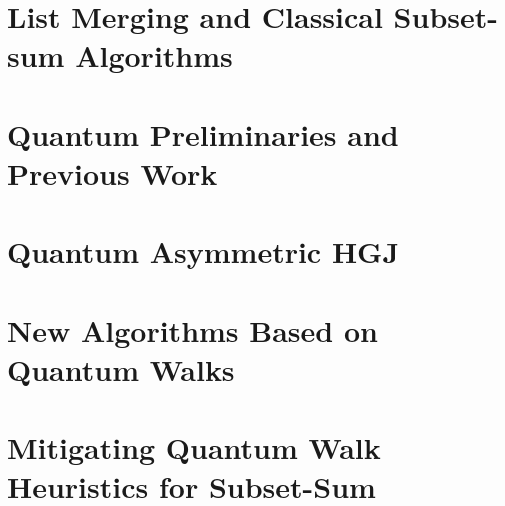 \documentclass{llncs}
\newcommand{\AS}[1]{\textcolor{red}{[{\bf Andr\'{e} S:} #1]}}
\renewcommand{\AS}[1]{}
\begin{document}
\section{List Merging and Classical Subset-sum Algorithms}
\label{section:classical-algos}


\section{Quantum Preliminaries and Previous Work}
\label{section:quantum-prelim}


%

%

\section{Quantum Asymmetric HGJ}
\label{section:hgj-asymmetric}


\section{New Algorithms Based on Quantum Walks}
\label{section:new-qw}




\section{Mitigating Quantum Walk Heuristics for Subset-Sum}
\label{section:fix-qw}
%




%
\end{document}
